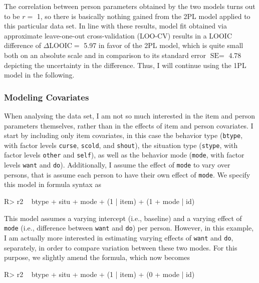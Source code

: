\documentclass[
]{jss}
\begin{document}
The correlation between person parameters obtained by the two models
turns out to be \(r =\) 1, so there is basically nothing gained from the
2PL model applied to this particular data set. In line with these
results, model fit obtained via approximate leave-one-out
cross-validation (LOO-CV) results in a LOOIC difference of
\(\Delta \text{LOOIC} =\) 5.97 in favor of the 2PL model, which is quite
small both on an absolute scale and in comparison to its standard error
\(\text{SE} =\) 4.78 depicting the uncertainty in the difference. Thus,
I will continue using the 1PL model in the following.

\hypertarget{modeling-covariates}{%
\subsubsection{Modeling Covariates}\label{modeling-covariates}}

When analysing the  data set, I am not so much interested
in the item and person parameters themselves, rather than in the effects
of item and person covariates. I start by including only item
covariates, in this case the behavior type (\texttt{btype}, with factor
levels \texttt{curse}, \texttt{scold}, and \texttt{shout}), the
situation type (\texttt{stype}, with factor levels \texttt{other} and
\texttt{self}), as well as the behavior mode (\texttt{mode}, with factor
levels \texttt{want} and \texttt{do}). Additionally, I assume the effect
of \texttt{mode} to vary over persons, that is assume each person to
have their own effect of \texttt{mode}. We specify this model in formula
syntax as

\begin{CodeChunk}

\begin{CodeInput}
R> r2 ~ btype + situ + mode + (1 | item) + (1 + mode | id)
\end{CodeInput}
\end{CodeChunk}

This model assumes a varying intercept (i.e., baseline) and a varying
effect of \texttt{mode} (i.e., difference between \texttt{want} and
\texttt{do}) per person. However, in this example, I am actually more
interested in estimating varying effects of \texttt{want} and
\texttt{do}, separately, in order to compare variation between these two
modes. For this purpose, we slightly amend the formula, which now
becomes

\begin{CodeChunk}

\begin{CodeInput}
R> r2 ~ btype + situ + mode + (1 | item) + (0 + mode | id)
\end{CodeInput}
\end{CodeChunk}
\end{document}
